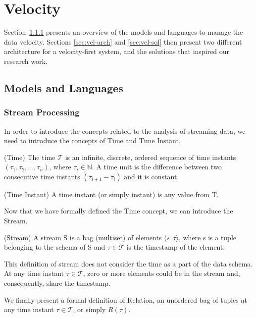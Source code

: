 \section{Velocity}\label{sec:velocity}
Section~\ref{sec:stream-proc} presents an overview of the models and languages to manage the data velocity. Sections \ref{sec:vel-arch} and \ref{sec:vel-sol} then present two different architecture for a velocity-first system, and the solutions that inspired our research work.

\subsection{Models and Languages}

\subsubsection{Stream Processing} \label{sec:stream-proc}
In order to introduce the concepts related to the analysis of streaming data, we need to introduce the concepts of Time and Time Instant.

\begin{Definition}
(Time) The time $\mathcal{T}$ is an infinite, discrete, ordered sequence of time instants $(\tau_1,\tau_2,..., \tau_n)$, where $\tau_i \in \mathbb{N}$. A time unit is the difference between two consecutive time instants $(\tau_{i+1} - \tau_i)$ and it is constant.
\end{Definition}

\begin{Definition}
(Time Instant) A time instant (or simply instant) is any value from T.
\end{Definition}

Now that we have formally defined the Time concept, we can introduce the Stream.

\begin{Definition}
(Stream) A stream S is a bag (multiset) of elements $\langle s,\tau \rangle$, where s is a tuple belonging to the schema of S and $\tau \in \mathcal{T}$ is the timestamp of the element.
\end{Definition}

This definition of stream does not consider the time as a part of the data schema. 
At any time instant $\tau \in \mathcal{T}$, zero or more elements could be in the stream and, consequently, share the timestamp.

We finally present a formal definition of Relation, an unordered bag of tuples at any time instant $\tau \in \mathcal{T}$, or simply $R(\tau)$.

